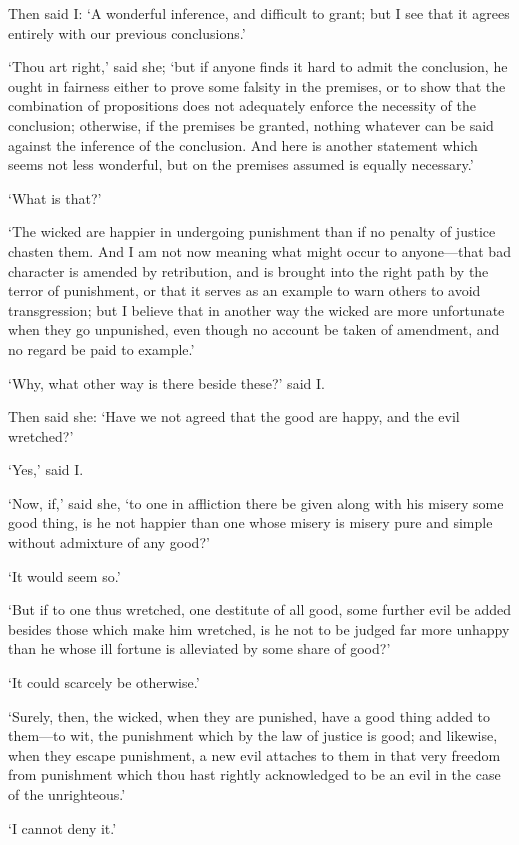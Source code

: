 \documentclass[12pt]{book}
\begin{document}
Then said I: `A wonderful inference, and difficult to grant; but I see
that it agrees entirely with our previous conclusions.'

`Thou art right,' said she; `but if anyone finds it hard to admit the
conclusion, he ought in fairness either to prove some falsity in the
premises, or to show that the combination of propositions does not
adequately enforce the necessity of the conclusion; otherwise, if the
premises be granted, nothing whatever can be said against the inference
of the conclusion. And here is another statement which seems not less
wonderful, but on the premises assumed is equally necessary.'

`What is that?'

`The wicked are happier in undergoing punishment than if no penalty of
justice chasten them. And I am not now meaning what might occur to
anyone---that bad character is amended by retribution, and is brought
into the right path by the terror of punishment, or that it serves as an
example to warn others to avoid transgression; but I believe that in
another way the wicked are more unfortunate when they go unpunished,
even though no account be taken of amendment, and no regard be paid to
example.'

`Why, what other way is there beside these?' said I.

Then said she: `Have we not agreed that the good are happy, and the evil
wretched?'

`Yes,' said I.

`Now, if,' said she, `to one in affliction there be given along with his
misery some good thing, is he not happier than one whose misery is
misery pure and simple without admixture of any good?'

`It would seem so.'

`But if to one thus wretched, one destitute of all good, some further
evil be added besides those which make him wretched, is he not to be
judged far more unhappy than he whose ill fortune is alleviated by some
share of good?'

`It could scarcely be otherwise.'

`Surely, then, the wicked, when they are punished, have a good thing
added to them---to wit, the punishment which by the law of justice is
good; and likewise, when they escape punishment, a new evil attaches to
them in that very freedom from punishment which thou hast rightly
acknowledged to be an evil in the case of the unrighteous.'

`I cannot deny it.'
\end{document}
